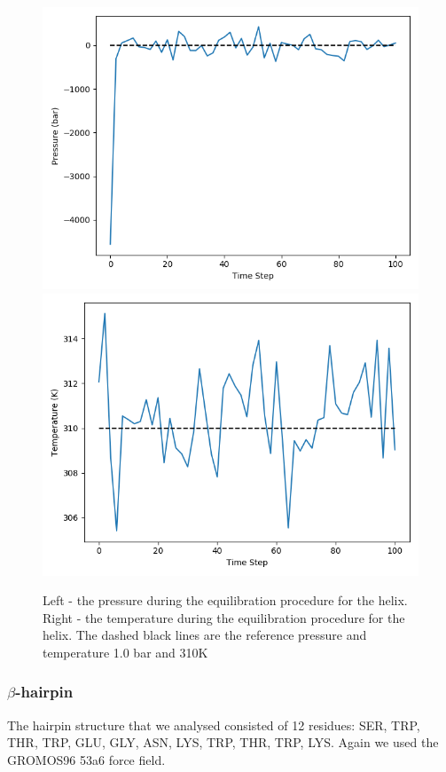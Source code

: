 \documentclass[12pt, onecolumn]{revtex4}    %
\begin{document}
\begin{figure}[h!]
\includegraphics[scale=0.4]{HElixNPTP}
\includegraphics[scale=0.4]{HElixNPTT}
\caption{Left - the pressure during the equilibration procedure for the helix.  Right - the temperature during the equilibration procedure for the helix.  The dashed black lines are the reference pressure and temperature 1.0 bar and 310K}
\end{figure}

\subsubsection{$\beta$-hairpin}

The hairpin structure that we analysed consisted of 12 residues: SER, TRP, THR, TRP, GLU, GLY, ASN, LYS, TRP, THR, TRP, LYS.  Again we used the GROMOS96 53a6 force field\cite{FF}.\\
\end{document}
